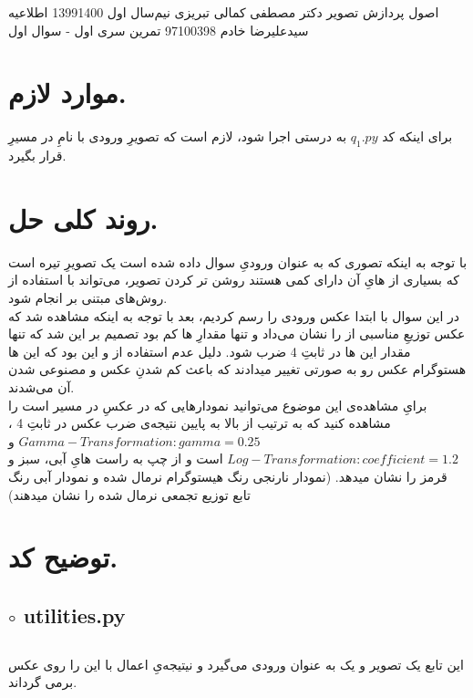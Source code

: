 \documentclass[a4paper,12pt]{article}
\begin{document}
\handout
{اصول پردازش تصویر}
{دکتر مصطفی کمالی تبریزی}
{نیم‌سال اول 1399\lr{-}1400}
{اطلاعیه}
{سیدعلیرضا خادم}
{97100398}
 {تمرین سری اول - سوال اول}
\section*{موارد لازم.}
برای اینکه کد 
$ q_1.py $
به درستی اجرا شود، لازم است که تصویرِ ورودی با نامِ
در مسیرِ 
قرار بگیرد.
\section*{روند کلی حل.}
با توجه به اینکه تصوری که به عنوان ورودیِ سوال داده شده است یک تصویرِ تیره است که بسیاری از 
هایِ آن دارای 
کمی هستند روشن تر کردن تصویر، می‌تواند با استفاده از روش‌های 
مبتنی بر 
انجام شود.\\
در این سوال با ابتدا 
عکس ورودی را رسم کردیم، بعد با توجه به اینکه مشاهده شد که
عکس توزیعِ مناسبی از 
 را نشان می‌داد و تنها مقدارِ
 ها کم بود تصمیم بر این شد که تنها مقدار این 
 ها در ثابتِ 4 ضرب شود. دلیل عدم استفاده از 
 و 
 این بود که این 
 ها هستوگرام عکس رو به صورتی تغییر میدادند که باعث کم شدنِ
عکس و مصنوعی شدن آن می‌شدند.\\ برایِ مشاهده‌ی این موضوع می‌توانید نمودارهایی که در عکسِ
در مسیر
است را مشاهده کنید که به ترتیب از بالا به پایین نتیجه‌ی ضرب عکس در ثابتِ 4 ، 
$ Gamma-Transformation :gamma = 0.25 $
و
$Log-Transformation : coefficient = 1.2 $
است و از چپ به راست 
هایِ آبی، سبز و قرمز را نشان میدهد. (نمودار نارنجی رنگ هیستوگرام نرمال شده و نمودار آبی رنگ تابع توزیع تجمعی نرمال شده را نشان میدهند)
\section*{توضیح کد.}
\subsection*{$\circ$ utilities.py}
\subsection*{}
این تابع یک تصویر و یک 
به عنوان ورودی می‌گیرد و نیتیجه‌یِ اعمال 
با این 
را روی عکس برمی گرداند.
\end{document}
